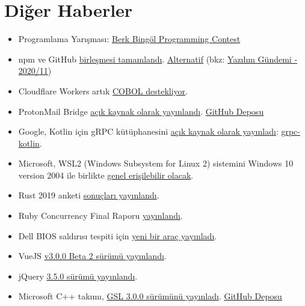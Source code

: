 \documentclass[11pt]{article}
\begin{document}
\section{Diğer Haberler}
\label{sec:org9d193d3}
\begin{itemize}
\item Programlama Yarışması: \href{https://ku.acm.org/berkbingol/}{Berk Bingöl Programming Contest}
\item npm ve GitHub \href{https://github.blog/2020-04-15-npm-has-joined-github/}{birleşmesi tamamlandı}. \href{https://blog.npmjs.org/post/612764866888007680/next-phase-montage}{Alternatif} (bkz: \href{../11/yazilim-gundemi-2020-11.pdf}{Yazılım Gündemi -
2020/11})
\item Cloudflare Workers artık \href{https://blog.cloudflare.com/cloudflare-workers-now-support-cobol/}{COBOL destekliyor}.
\item ProtonMail Bridge \href{https://protonmail.com/blog/bridge-open-source/}{açık kaynak olarak yayınlandı}. \href{https://github.com/ProtonMail/proton-bridge}{GitHub Deposu}
\item Google, Kotlin için gRPC kütüphanesini \href{https://cloud.google.com/blog/products/application-development/use-grpc-with-kotlin}{açık kaynak olarak yayınladı}:
\href{https://github.com/grpc/grpc-kotlin}{grpc-kotlin}.
\item Microsoft, WSL2 (Windows Subsystem for Linux 2) sistemini Windows 10 version
2004 ile birlikte \href{https://www.infoq.com/news/2020/04/wsl-2-general-availability/}{genel erişilebilir olacak}.
\item Rust 2019 anketi \href{https://blog.rust-lang.org/2020/04/17/Rust-survey-2019.html}{sonuçları yayınlandı}.
\item Ruby Concurrency Final Raporu \href{https://www.codeotaku.com/journal/2020-01/ruby-concurrency-progress-report/index}{yayınlandı}.
\item Dell BIOS saldırısı tespiti için \href{https://www.zdnet.com/article/dell-releases-new-tool-to-detect-bios-attacks/}{yeni bir araç yayınladı}.
\item VueJS \href{https://github.com/vuejs/vue-next/releases/tag/v3.0.0-beta.2}{v3.0.0 Beta 2 sürümü yayınlandı}.
\item jQuery \href{http://blog.jquery.com/2020/04/10/jquery-3-5-0-released/}{3.5.0 sürümü yayınlandı}.
\item Microsoft C++ takımı, \href{https://devblogs.microsoft.com/cppblog/gsl-3-0-0-release/}{GSL 3.0.0 sürümünü yayınladı}. \href{https://github.com/microsoft/GSL}{GitHub Deposu}

\end{itemize}
\end{document}
